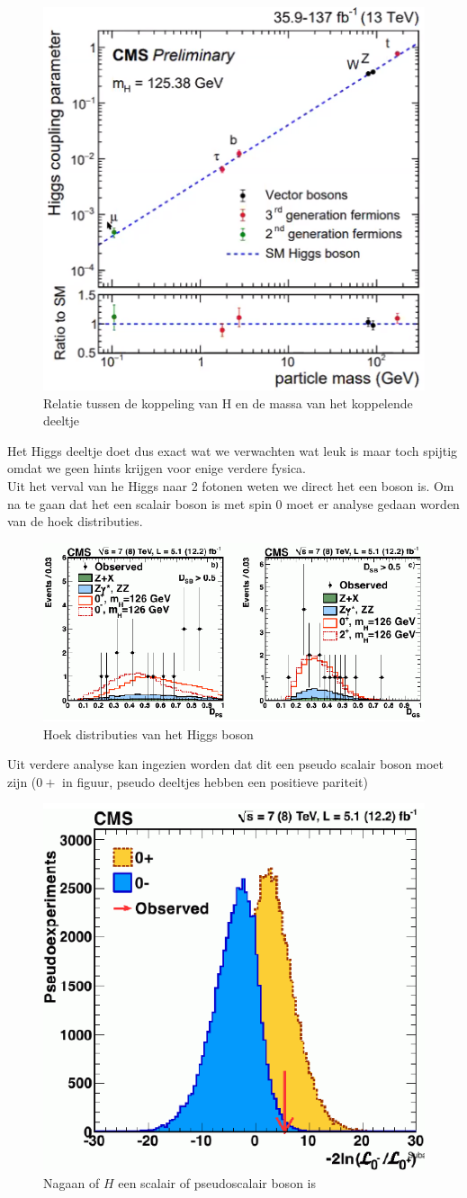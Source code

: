 \documentclass[../main.tex]{subfiles}
\begin{document}
\begin{figure}[h]
    \centering
    \includegraphics[width=0.4\linewidth]{higgs_boson/h_koppeling_massa.png}
    \caption{Relatie tussen de koppeling van H en de massa van het koppelende deeltje}%
    \label{fig:higgs_boson/h_koppeling_massa}
\end{figure}

Het Higgs deeltje doet dus exact wat we verwachten wat leuk is maar toch spijtig omdat we geen hints krijgen voor enige verdere fysica.\\
Uit het verval van he Higgs naar 2 fotonen weten we direct het een boson is. Om na te gaan dat het een scalair boson is met spin 0 moet er analyse gedaan worden van de hoek distributies.

\begin{figure}[h]
    \centering
    \includegraphics[width=0.5\linewidth]{higgs_boson/h_hoek_dist.png}
    \caption{Hoek distributies van het Higgs boson}%
    \label{fig:higgs_boson/h_hoek_dist}
\end{figure}

Uit verdere analyse kan ingezien worden dat dit een pseudo scalair boson moet zijn ($0+$ in figuur, pseudo deeltjes hebben een positieve pariteit)

\begin{figure}[h]
    \centering
    \includegraphics[width=0.5\linewidth]{higgs_boson/h_vec_boson.png}
    \caption{Nagaan of $H$ een scalair of pseudoscalair boson is}%
    \label{fig:higgs_boson/h_vec_boson}
\end{figure}
\end{document}
